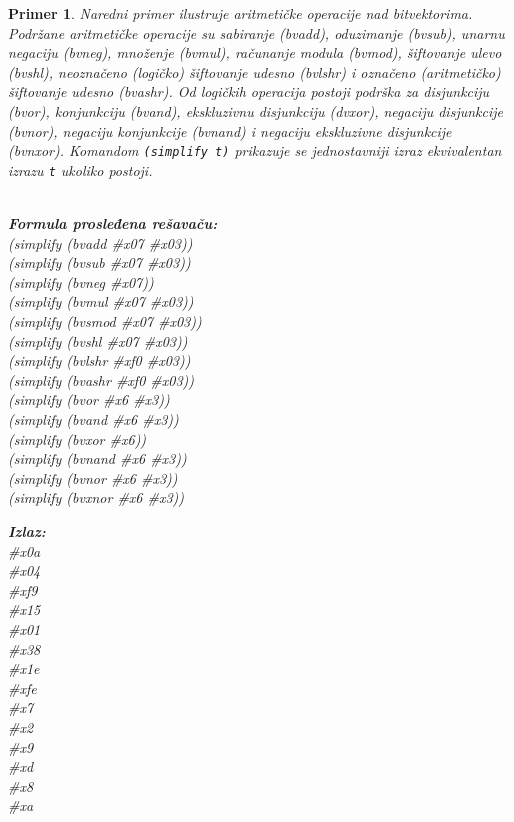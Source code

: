 \documentclass[12pt,oneside]{memoir}
\newtheorem{primer}{Primer}
\begin{document}
\begin{primer} Naredni primer ilustruje aritmetičke operacije nad bitvektorima. Podržane aritmetičke operacije su sabiranje (bvadd), oduzimanje (bvsub), unarnu negaciju (bvneg), množenje (bvmul), računanje modula (bvmod), šiftovanje ulevo (bvshl), neoznačeno (logičko) šiftovanje udesno (bvlshr) i označeno (aritmetičko) šiftovanje udesno (bvashr). Od logičkih operacija postoji podrška za disjunkciju (bvor), konjunkciju (bvand), ekskluzivnu disjunkciju (dvxor), negaciju disjunkcije (bvnor), negaciju konjunkcije (bvnand) i negaciju ekskluzivne disjunkcije (bvnxor).
Komandom \texttt{(simplify t)} prikazuje se jednostavniji izraz ekvivalentan izrazu \texttt{t} ukoliko postoji.
\\\\
\begin{minipage}[b]{0.5\textwidth}
\textbf{Formula prosleđena rešavaču:}
\\(simplify (bvadd \#x07 \#x03)) 
\\(simplify (bvsub \#x07 \#x03)) 
\\(simplify (bvneg \#x07))       
\\(simplify (bvmul \#x07 \#x03)) 
\\(simplify (bvsmod \#x07 \#x03)) 
\\(simplify (bvshl \#x07 \#x03)) 
\\(simplify (bvlshr \#xf0 \#x03))  
\\(simplify (bvashr \#xf0 \#x03))  
\\(simplify (bvor \#x6 \#x3)) 
\\(simplify (bvand \#x6 \#x3))  
\\(simplify (bvxor \#x6)) 
\\(simplify (bvnand \#x6 \#x3)) 
\\(simplify (bvnor \#x6 \#x3)) 
\\(simplify (bvxnor \#x6 \#x3)) 
\end{minipage}
\hspace{2.5cm}
\begin{minipage}[b]{0.5\textwidth}
\textbf{Izlaz:}
\\\#x0a 
\\\#x04 
\\\#xf9 
\\\#x15 
\\\#x01 
\\\#x38 
\\\#x1e 
\\\#xfe
\\\#x7 
\\\#x2 
\\\#x9 
\\\#xd 
\\\#x8 
\\\#xa
\end{minipage}

\end{primer}
\end{document}

